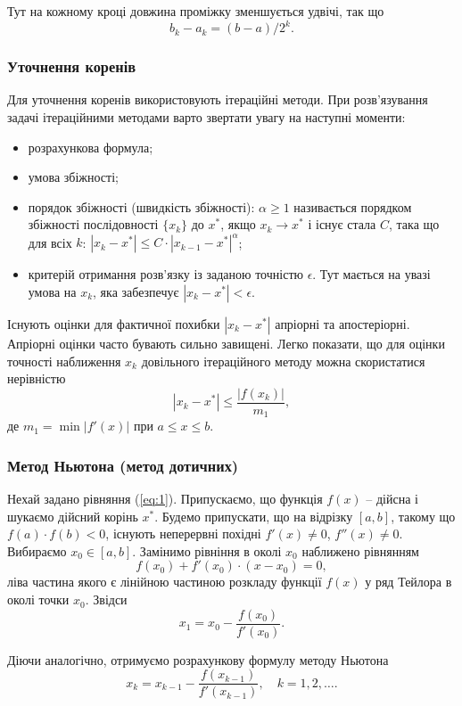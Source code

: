 Тут на кожному кроці довжина проміжку зменшується удвічі, так що
\[ b_k - a_k = (b - a) / 2^k. \]

\subsubsection{Уточнення коренів}

Для уточнення коренів використовують ітераційні методи. При розв'язування задачі ітераційними методами варто звертати увагу на наступні моменти:
\begin{itemize}
	\item розрахункова формула;
	\item умова збіжності;
	\item порядок збіжності (швидкість збіжності): $\alpha \ge 1$ називається порядком збіжності послідовності $\{ x_k \}$ до $x^*$, якщо $x_k \to x^*$ і існує стала $C$, така що для всіх $k$: $|x_k - x^*| \le C \cdot |x_{k-1} - x^*|^\alpha$;
	\item критерій отримання розв'язку із заданою точністю $\epsilon$. Тут мається на увазі умова на $x_k$,  яка забезпечує $|x_k - x^*| < \epsilon$.
\end{itemize}

Існують оцінки для фактичної похибки $|x_k - x^*|$ апріорні та апостеріорні. Апріорні оцінки часто бувають сильно завищені. Легко показати, що для оцінки точності наближення $x_k$ довільного ітераційного методу можна скористатися нерівністю 
\begin{equation}
	\label{eq:2}
	|x_k - x^*| \le \frac{|f(x_k)|}{m_1},
\end{equation}
де $m_1 = \min |f'(x)|$ при $a \le x \le b$.

\subsubsection{Метод Ньютона (метод дотичних)}

Нехай задано рівняння (\ref{eq:1}). Припускаємо, що функція $f(x)$ -- дійсна і шукаємо дійсний корінь $x^*$. Будемо припускати, що на відрізку $[a, b]$, такому що $f(a) \cdot f(b) < 0$, існують неперервні похідні $f'(x) \ne 0$, $f''(x) \ne 0$. Вибираємо $x_0 \in [a, b]$. Замінимо рівніння в околі $x_0$ наближено рівнянням
\[ f(x_0) + f'(x_0) \cdot (x - x_0) = 0, \]
ліва частина якого є лінійною частиною розкладу функції $f(x)$ у ряд Тейлора в околі точки $x_0$. Звідси
\[ x_1 = x_0 - \frac{f(x_0)}{f'(x_0)}. \]

Діючи аналогічно, отримуємо розрахункову формулу методу Ньютона
\begin{equation}
	\label{eq:3}
	x_k = x_{k-1} - \frac{f(x_{k-1})}{f'(x_{k-1})}, \quad k = 1, 2, \ldots.
\end{equation}

